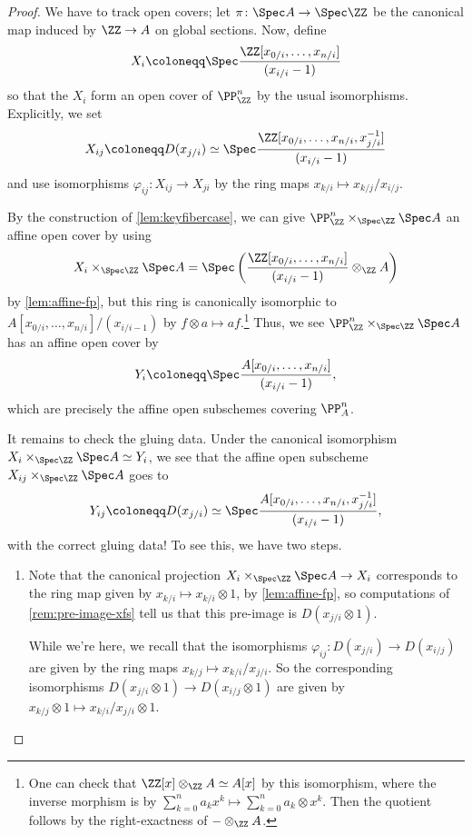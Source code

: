 \documentclass[../notes.tex]{subfiles}
\begin{document}
\begin{proof}
	We have to track open covers; let $\pi\colon\Spec A\to\Spec\ZZ$ be the canonical map induced by $\ZZ\to A$ on global sections. Now, define
	\[X_i\coloneqq\Spec\frac{\ZZ[x_{0/i},\ldots,x_{n/i}]}{(x_{i/i}-1)}\]
	so that the $X_i$ form an open cover of $\PP^n_\ZZ$ by the usual isomorphisms. Explicitly, we set
	\[X_{ij}\coloneqq D(x_{j/i})\simeq\Spec\frac{\ZZ[x_{0/i},\ldots,x_{n/i},x_{j/i}^{-1}]}{(x_{i/i}-1)}\]
	and use isomorphisms $\varphi_{ij}\colon X_{ij}\to X_{ji}$ by the ring maps $x_{k/i}\mapsto x_{k/j}/x_{i/j}$.
	
	By the construction of \autoref{lem:keyfibercase}, we can give $\PP^n_\ZZ\times_{\Spec\ZZ}\Spec A$ an affine open cover by using
	\[X_i\times_{\Spec\ZZ}\Spec A=\Spec\left(\frac{\ZZ[x_{0/i},\ldots,x_{n/i}]}{(x_{i/i}-1)}\otimes_\ZZ A\right)\]
	by \autoref{lem:affine-fp}, but this ring is canonically isomorphic to $A[x_{0/i},\ldots,x_{n/i}]/(x_{i/i-1})$ by $f\otimes a\mapsto af$.\footnote{One can check that $\ZZ[x]\otimes_\ZZ A\simeq A[x]$ by this isomorphism, where the inverse morphism is by $\sum_{k=0}^na_kx^k\mapsto\sum_{k=0}^na_k\otimes x^k$. Then the quotient follows by the right-exactness of $-\otimes_\ZZ A$.} Thus, we see $\PP^n_\ZZ\times_{\Spec\ZZ}\Spec A$ has an affine open cover by
	\[Y_i\coloneqq\Spec\frac{A[x_{0/i},\ldots,x_{n/i}]}{(x_{i/i}-1)},\]
	which are precisely the affine open subschemes covering $\PP^n_A$.

	It remains to check the gluing data. Under the canonical isomorphism $X_i\times_{\Spec\ZZ}\Spec A\simeq Y_i$, we see that the affine open subscheme $X_{ij}\times_{\Spec\ZZ}\Spec A$ goes to
	\[Y_{ij}\coloneqq D(x_{j/i})\simeq\Spec\frac{A[x_{0/i},\ldots,x_{n/i},x_{j/i}^{-1}]}{(x_{i/i}-1)},\]
	with the correct gluing data! To see this, we have two steps.
	\begin{enumerate}
		\item Note that the canonical projection $X_i\times_{\Spec\ZZ}\Spec A\to X_i$ corresponds to the ring map given by $x_{k/i}\mapsto x_{k/i}\otimes1$, by \autoref{lem:affine-fp}, so computations of \autoref{rem:pre-image-xfs} tell us that this pre-image is $D(x_{j/i}\otimes1)$.

		While we're here, we recall that the isomorphisms $\varphi_{ij}\colon D(x_{j/i})\to D(x_{i/j})$ are given by the ring maps $x_{k/j}\mapsto x_{k/i}/x_{j/i}$. So the corresponding isomorphisms $D(x_{j/i}\otimes1)\to D(x_{i/j}\otimes1)$ are given by $x_{k/j}\otimes1\mapsto x_{k/i}/x_{j/i}\otimes1$.


\end{enumerate}
\end{proof}
\end{document}
